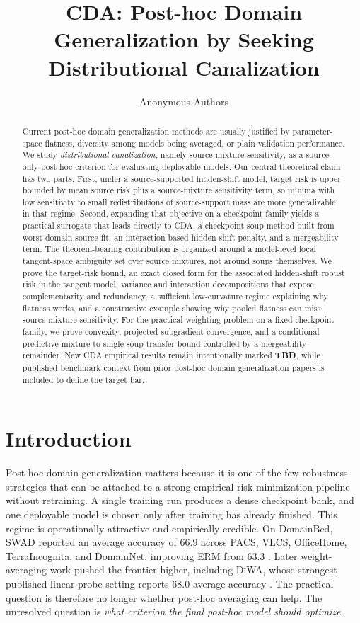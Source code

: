 \documentclass{article}
\title{CDA: Post-hoc Domain Generalization by Seeking Distributional Canalization}
\author{Anonymous Authors}
\theoremstyle{definition}
\newcommand{\TBD}{\textbf{TBD}}
\newcommand{\cda}{\textup{\textsc{CDA}}}
\newcommand{\swad}{\textup{\textsc{SWAD}}}
\newcommand{\diwa}{\textup{\textsc{DiWA}}}
\newcommand{\erm}{\textup{\textsc{ERM}}}
\begin{document}
\maketitle

\begin{abstract}
Current post-hoc domain generalization methods are usually justified by parameter-space flatness, diversity among models being averaged, or plain validation performance. We study \emph{distributional canalization}, namely source-mixture sensitivity, as a source-only post-hoc criterion for evaluating deployable models. Our central theoretical claim has two parts. First, under a source-supported hidden-shift model, target risk is upper bounded by mean source risk plus a source-mixture sensitivity term, so minima with low sensitivity to small redistributions of source-support mass are more generalizable in that regime. Second, expanding that objective on a checkpoint family yields a practical surrogate that leads directly to \cda{}, a checkpoint-soup method built from worst-domain source fit, an interaction-based hidden-shift penalty, and a mergeability term. The theorem-bearing contribution is organized around a model-level local tangent-space ambiguity set over source mixtures, not around soups themselves. We prove the target-risk bound, an exact closed form for the associated hidden-shift robust risk in the tangent model, variance and interaction decompositions that expose complementarity and redundancy, a sufficient low-curvature regime explaining why flatness works, and a constructive example showing why pooled flatness can miss source-mixture sensitivity. For the practical weighting problem on a fixed checkpoint family, we prove convexity, projected-subgradient convergence, and a conditional predictive-mixture-to-single-soup transfer bound controlled by a mergeability remainder. New \cda{} empirical results remain intentionally marked \TBD{}, while published benchmark context from prior post-hoc domain generalization papers is included to define the target bar.
\end{abstract}

\section{Introduction}

Post-hoc domain generalization matters because it is one of the few robustness strategies that can be attached to a strong empirical-risk-minimization pipeline without retraining. A single training run produces a dense checkpoint bank, and one deployable model is chosen only after training has already finished. This regime is operationally attractive and empirically credible. On DomainBed, \swad{} reported an average accuracy of \(66.9\) across PACS, VLCS, OfficeHome, TerraIncognita, and DomainNet, improving \erm{} from \(63.3\) \citep{cha2021swad}. Later weight-averaging work pushed the frontier higher, including \diwa{}, whose strongest published linear-probe setting reports \(68.0\) average accuracy \citep{rame2022diwa}. The practical question is therefore no longer whether post-hoc averaging can help. The unresolved question is \emph{what criterion the final post-hoc model should optimize}.
\end{document}
